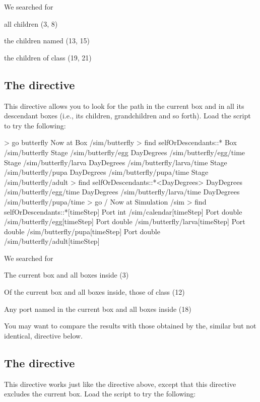 \noindent
We searched for 
\begin{compactitem}
\item all children (3, 8)
\item the children named  (13, 15)
\item the children of class  (19, 21)
\end{compactitem}

%
%
\subsection{The  directive}
This directive allows you to look for the path in the current box and in all its descendant boxes (i.e., its children, grandchildren and so forth). Load the  script to  try the following:

\lstset{numbers=left}
\begin{usdialog}
> go butterfly
Now at Box /sim/butterfly
> find selfOrDescendants::*
Box        /sim/butterfly
Stage      /sim/butterfly/egg
DayDegrees /sim/butterfly/egg/time
Stage      /sim/butterfly/larva
DayDegrees /sim/butterfly/larva/time
Stage      /sim/butterfly/pupa
DayDegrees /sim/butterfly/pupa/time
Stage      /sim/butterfly/adult
> find selfOrDescendants::*<DayDegrees>
DayDegrees /sim/butterfly/egg/time
DayDegrees /sim/butterfly/larva/time
DayDegrees /sim/butterfly/pupa/time
> go /
Now at Simulation /sim
> find selfOrDescendants::*[timeStep]
Port int    /sim/calendar[timeStep]
Port double /sim/butterfly/egg[timeStep]
Port double /sim/butterfly/larva[timeStep]
Port double /sim/butterfly/pupa[timeStep]
Port double /sim/butterfly/adult[timeStep]
\end{usdialog}
\lstset{numbers=none}

\noindent
We searched for 
\begin{compactitem}
\item The current box and all boxes inside (3)
\item Of the current box and all boxes inside, those of class  (12)
\item Any port named  in the current box and all boxes inside (18)
\end{compactitem}

You may want to compare the results with those obtained by the, similar but not identical,  directive below.

%
%
\subsection{The  directive}
This directive works just like the  directive above, except that this directive excludes the current box. Load the  script to try the following:

